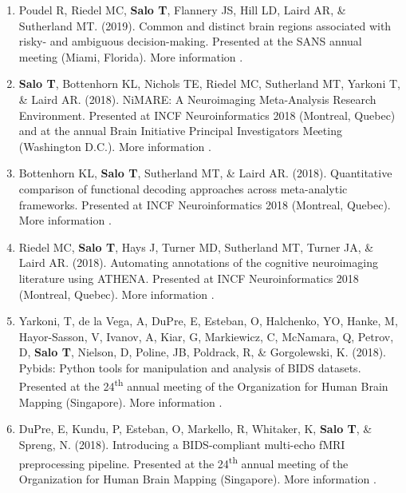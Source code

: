 \documentclass[10pt]{article}
\newcommand{\textlink}[3][blue]{\href{#2}{\color{#1}{#3}}}
\begin{document}
\begin{enumerate}
	\item Poudel R, Riedel MC, \textbf{Salo T}, Flannery JS, Hill LD,
	Laird AR, \& Sutherland MT. (2019).
	Common and distinct brain regions associated with risky- and ambiguous decision-making.
	Presented at the SANS annual meeting (Miami, Florida).
	More information
	\textlink{https://nbclab.github.io/posters/poudel-sans-poster}{here}.

	\item \textbf{Salo T}, Bottenhorn KL, Nichols TE, Riedel MC, Sutherland MT, Yarkoni T, \& Laird AR. (2018).
	NiMARE: A Neuroimaging Meta-Analysis Research Environment.
	Presented at INCF Neuroinformatics 2018 (Montreal, Quebec) and at the annual
	Brain Initiative Principal Investigators Meeting (Washington D.C.).
	More information
	\textlink{https://f1000research.com/posters/7-1221}{here}.

	\item Bottenhorn KL, \textbf{Salo T}, Sutherland MT, \& Laird AR. (2018).
	Quantitative comparison of functional decoding approaches across meta-analytic frameworks.
	Presented at INCF Neuroinformatics 2018 (Montreal, Quebec).
	More information
	\textlink{https://f1000research.com/posters/7-1222}{here}.

	\item Riedel MC, \textbf{Salo T}, Hays J, Turner MD, Sutherland MT, Turner JA, \& Laird AR. (2018).
	Automating annotations of the cognitive neuroimaging literature using ATHENA.
	Presented at INCF Neuroinformatics 2018 (Montreal, Quebec).
	More information
	\textlink{https://f1000research.com/posters/7-1229}{here}.

	\item Yarkoni, T, de la Vega, A, DuPre, E, Esteban, O, Halchenko, YO,
	Hanke, M, Hayor-Sasson, V, Ivanov, A, Kiar, G, Markiewicz, C, McNamara, Q,
	Petrov, D, \textbf{Salo T}, Nielson, D, Poline, JB, Poldrack, R,
	\& Gorgolewski, K. (2018).
	Pybids: Python tools for manipulation and analysis of BIDS datasets.
	Presented at the 24\textsuperscript{th} annual meeting of the Organization
	for Human Brain Mapping (Singapore).
	More information
	\textlink{https://ww5.aievolution.com/hbm1801/index.cfm?do=abs.viewAbs&abs=3300}{here}.

	\item DuPre, E, Kundu, P, Esteban, O, Markello, R, Whitaker, K,
	\textbf{Salo T}, \& Spreng, N. (2018).
	Introducing a BIDS-compliant multi-echo fMRI preprocessing pipeline.
	Presented at the 24\textsuperscript{th} annual meeting of the Organization
	for Human Brain Mapping (Singapore).
	More information
	\textlink{https://ww5.aievolution.com/hbm1801/index.cfm?do=abs.viewAbs&abs=2789}{here}.


\end{enumerate}
\end{document}

